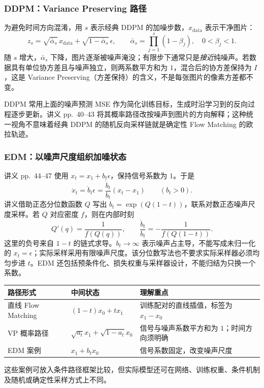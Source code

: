 \subsubsection*{DDPM：Variance Preserving 路径}

为避免时间方向混淆，用 $s$ 表示经典 DDPM 的加噪步数，$x_{\mathrm{data}}$ 表示干净图片：
\[
  z_s=\sqrt{\bar\alpha_s}\,x_{\mathrm{data}}
    +\sqrt{1-\bar\alpha_s}\,\epsilon,\qquad
  \bar\alpha_s=\prod_{j=1}^{s}(1-\beta_j),\quad 0<\beta_j<1.
\]
随 $s$ 增大，$\bar\alpha_s$ 下降，图片逐渐被噪声淹没；有限步下通常只是\emph{接近}纯噪声。若数据具有单位协方差且与噪声独立，则两系数平方和为 $1$，混合后的协方差保持为 $I$，这是 Variance Preserving（方差保持）的含义，不是每张图片的像素方差都不变。

DDPM 常用上面的噪声预测 MSE 作为简化训练目标，生成时沿学习到的反向过程逐步更新。讲义 pp.~40--43 将其概率路径改按噪声到图片的方向解释；这种统一视角不意味着经典 DDPM 的随机反向采样链就是确定性 Flow Matching 的欧拉轨迹。

\subsubsection*{EDM：以噪声尺度组织加噪状态}

讲义 pp.~44--47 使用 $x_t=x_1+b_t\epsilon$，保持信号系数为 $1$。于是
\[
  \dot x_t=\dot b_t\epsilon
  =\frac{\dot b_t}{b_t}(x_t-x_1)\qquad(b_t>0).
\]
讲义借助正态分位数函数 $Q$ 写出 $b_t=\exp(Q(1-t))$，联系对数正态噪声尺度采样。若 $Q$ 对应密度 $f$，则在内部时刻
\[
  Q'(q)=\frac{1}{f(Q(q))},\qquad
  \frac{\dot b_t}{b_t}=-\frac{1}{f(Q(1-t))}.
\]
这里的负号来自 $1-t$ 的链式求导。$b_t\to\infty$ 表示噪声占主导，不能写成未归一化的 $x_t=\epsilon$；实际采样采用有限噪声尺度。该分位数写法也不要求实际采样器必须均匀步进 $t$。EDM 还包括预条件化、损失权重与采样器设计，不能归结为只换一个系数。

\begin{center}
\small
\begin{tabularx}{\textwidth}{@{}l l X@{}}
  \toprule
  路径形式 & 中间状态 & 理解重点 \\
  \midrule
  直线 Flow Matching & $(1-t)x_0+t x_1$ & 训练配对的直线插值，标签为 $x_1-x_0$ \\
  VP 概率路径 & $\sqrt{a_t}x_1+\sqrt{1-a_t}x_0$ & 信号与噪声系数平方和为 $1$；时间方向须明确 \\
  EDM 案例 & $x_1+b_t x_0$ & 信号系数固定，改变噪声尺度 \\
  \bottomrule
\end{tabularx}
\end{center}
这些案例可放入条件路径框架比较，但实际模型还可在网络、训练权重、条件机制及随机或确定性采样方式上不同。

